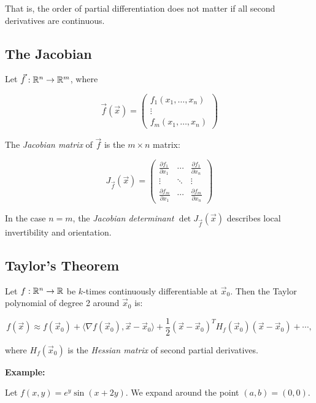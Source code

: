 That is, the order of partial differentiation does not matter if all second derivatives are continuous.

\subsection{The Jacobian}

Let \( \vec{f} : \mathbb{R}^n \to \mathbb{R}^m \), where

\[
    \vec{f}(\vec{x}) = \begin{pmatrix}
    f_1(x_1, \dots, x_n) \\
    \vdots \\
    f_m(x_1, \dots, x_n)
    \end{pmatrix}
\]

The \emph{Jacobian matrix} of \( \vec{f} \) is the \( m \times n \) matrix:

\[
    J_{\vec{f}}(\vec{x}) = \begin{pmatrix}
    \frac{\partial f_1}{\partial x_1} & \cdots & \frac{\partial f_1}{\partial x_n} \\
    \vdots & \ddots & \vdots \\
    \frac{\partial f_m}{\partial x_1} & \cdots & \frac{\partial f_m}{\partial x_n}
    \end{pmatrix}
\]

In the case \( n = m \), the \emph{Jacobian determinant} \( \det J_{\vec{f}}(\vec{x}) \) 
describes local invertibility and orientation.


\subsection{Taylor's Theorem}

Let \( f : \mathbb{R}^n \to \mathbb{R} \) be \( k \)-times continuously differentiable at \( \vec{x}_0 \). Then 
the Taylor polynomial of degree 2 around \( \vec{x}_0 \) is:

\[
    f(\vec{x}) \approx f(\vec{x}_0) + \langle \nabla f(\vec{x}_0), \vec{x} - \vec{x}_0 \rangle + 
    \frac{1}{2} {(\vec{x} - \vec{x}_0)}^T H_f(\vec{x}_0)(\vec{x} - \vec{x}_0) + \cdots,
\]

where \( H_f(\vec{x}_0) \) is the \emph{Hessian matrix} of second partial derivatives.
\vspace{\baselineskip}

\textbf{Example:} 
\vspace{\baselineskip}

Let \( f(x, y) = e^y \sin(x + 2y) \). We expand around the point \( (a, b) = (0, 0) \).
\vspace{\baselineskip}

